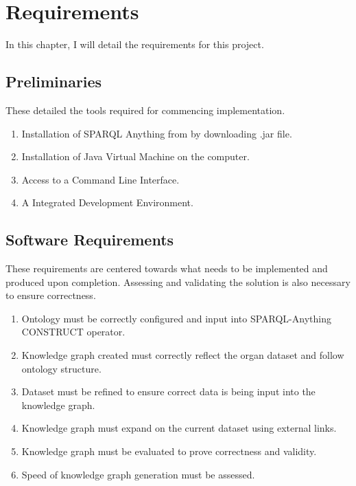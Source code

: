 \chapter{Requirements}
In this chapter, I will detail the requirements for this project. 

\section{Preliminaries}
\hspace{0.5cm} These detailed the tools required for commencing implementation.
\begin{enumerate}
\item Installation of SPARQL Anything from \cite{sparqlanythinggithub} by downloading .jar file.
\item Installation of Java Virtual Machine on the computer. 
\item Access to a Command Line Interface.
\item A Integrated Development Environment.
\end{enumerate}

\section{Software Requirements}
\hspace{0.5cm} These requirements are centered towards what needs to be implemented and produced upon completion. Assessing and validating the solution is also necessary to ensure correctness.
\begin{enumerate}
\item Ontology must be correctly configured and input into SPARQL-Anything CONSTRUCT operator.
\item Knowledge graph created must correctly reflect the organ dataset and follow ontology structure.
\item Dataset must be refined to ensure correct data is being input into the knowledge graph.
\item Knowledge graph must expand on the current dataset using external links.
\item Knowledge graph must be evaluated to prove correctness and validity.
\item Speed of knowledge graph generation must be assessed.
\end{enumerate}

